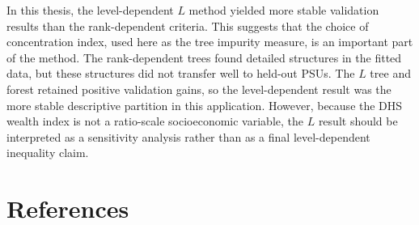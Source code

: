 \documentclass[
  11pt,
  a4paper,
]{article}
\begin{document}
In this thesis, the level-dependent \(L\) method yielded more stable
validation results than the rank-dependent criteria. This suggests that
the choice of concentration index, used here as the tree impurity
measure, is an important part of the method. The rank-dependent trees
found detailed structures in the fitted data, but these structures did
not transfer well to held-out PSUs. The \(L\) tree and forest retained
positive validation gains, so the level-dependent result was the more
stable descriptive partition in this application. However, because the
DHS wealth index is not a ratio-scale socioeconomic variable, the \(L\)
result should be interpreted as a sensitivity analysis rather than as a
final level-dependent inequality claim.

\section{References}\label{sec-references}
\end{document}
